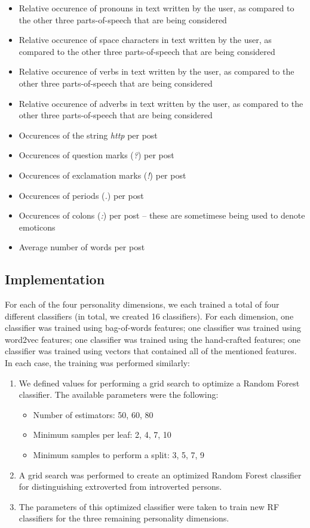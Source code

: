 \documentclass[12pt]{elsarticle}
\begin{document}
\begin{itemize}
\item Relative occurence of pronouns in text written by the user, as compared to the other three parts-of-speech that are being considered
\item Relative occurence of space characters in text written by the user, as compared to the other three parts-of-speech that are being considered
\item Relative occurence of verbs in text written by the user, as compared to the other three parts-of-speech that are being considered
\item Relative occurence of adverbs in text written by the user, as compared to the other three parts-of-speech that are being considered
\item Occurences of the string \textit{http} per post
\item Occurences of question marks (\textit{?}) per post
\item Occurences of exclamation marks (\textit{!}) per post
\item Occurences of periods (\textit{.}) per post
\item Occurences of colons (\textit{:}) per post -- these are sometimese being used to denote emoticons 
\item Average number of words per post
\end{itemize}




\subsection{Implementation}
For each of the four personality dimensions, we each trained a total of four different classifiers (in total, we created 16 classifiers). For each dimension, one classifier was trained using bag-of-words features; one classifier was trained using word2vec features; one classifier was trained using the hand-crafted features; one classifier was trained using vectors that contained all of the mentioned features. In each case, the training was performed similarly:
\begin{enumerate}
\item We defined values for performing a grid search to optimize a Random Forest classifier. The available parameters were the following:
\begin{itemize}
\item Number of estimators: 50, 60, 80
\item Minimum samples per leaf: 2, 4, 7, 10
\item Minimum samples to perform a split: 3, 5, 7, 9
\end{itemize}
\item A grid search was performed to create an optimized Random Forest classifier for distinguishing extroverted from introverted persons.
\item The parameters of this optimized classifier were taken to train new RF classifiers for the three remaining personality dimensions.
\end{enumerate}
\end{document}
